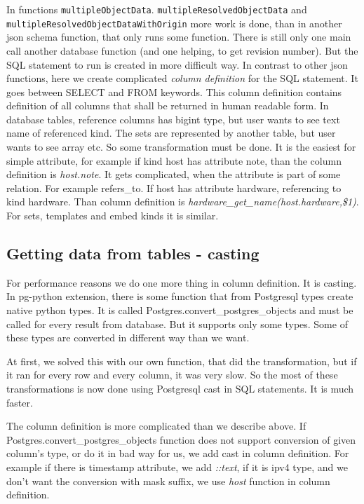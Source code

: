 \documentclass[deska]{subfiles}
\begin{document}
In functions {\tt multipleObjectData}. {\tt multipleResolvedObjectData} and {\tt multipleResolvedObjectDataWithOrigin}
more work is done, than in another json schema function, that only runs some function.
There is still only one main call another database function (and one helping, to get revision number).
But the SQL statement to run is created in more difficult way. In contrast to other json functions,
here we create complicated {\em column definition} for the SQL statement. It goes between SELECT and FROM keywords.
This column definition contains definition of all columns that shall be returned in human readable form.
In database tables, reference columns has bigint type, but user wants to see text name of referenced kind.
The sets are represented by another table, but user wants to see array etc. So some transformation must be done.
It is the easiest for simple attribute,
for example if kind host has attribute note, than the column definition is {\em host.note}.
It gets complicated, when the attribute is part of some relation. For example refers\_to.
If host has attribute hardware, referencing to kind hardware. Than column definition is 
{\em hardware\_get\_name(host.hardware,\$1)}. For sets, templates and embed kinds it is similar.

\subsection{Getting data from tables - casting}
\label{sec:cast}
For performance reasons we do one more thing in column definition. It is casting.
In pg-python extension, there is some function that from Postgresql types create native python types.
It is called Postgres.convert\_postgres\_objects
and must be called for every result from database. But it supports only some types.
Some of these types are converted in different way than we want.

At first, we solved this with our own function, that did the transformation, but if it ran for every
row and every column, it was very slow. So the most of these transformations is now done using Postgresql cast
in SQL statements. It is much faster.

The column definition is more complicated than we describe above. If
Postgres.convert\_postgres\_objects function 
does not support conversion of given column's type, or do it in bad way for us, we add cast in column definition.
For example if there is timestamp attribute, we add {\em ::text}, if it is ipv4 type, and we don't want
the conversion with mask suffix, we use {\em host} function in column definition.
\end{document}
